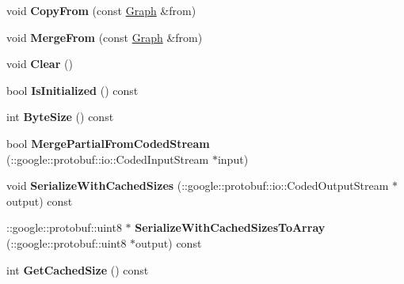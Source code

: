 \begin{DoxyCompactItemize}
\item 
\hypertarget{classgraph_1_1Graph_adea321f8fe4c18ea4d2364c8b8dd54df}{
void {\bfseries CopyFrom} (const \hyperlink{classgraph_1_1Graph}{Graph} \&from)}
\label{classgraph_1_1Graph_adea321f8fe4c18ea4d2364c8b8dd54df}

\item 
\hypertarget{classgraph_1_1Graph_a918dc2343415dd9b7d0deb2c307bfb9d}{
void {\bfseries MergeFrom} (const \hyperlink{classgraph_1_1Graph}{Graph} \&from)}
\label{classgraph_1_1Graph_a918dc2343415dd9b7d0deb2c307bfb9d}

\item 
\hypertarget{classgraph_1_1Graph_a13680e6719e42aa3ebedfeb61ff06014}{
void {\bfseries Clear} ()}
\label{classgraph_1_1Graph_a13680e6719e42aa3ebedfeb61ff06014}

\item 
\hypertarget{classgraph_1_1Graph_ac91ebe6fc014af3707afd28a01bf30cc}{
bool {\bfseries IsInitialized} () const }
\label{classgraph_1_1Graph_ac91ebe6fc014af3707afd28a01bf30cc}

\item 
\hypertarget{classgraph_1_1Graph_ada721f70b6221bd45c0619de513bc138}{
int {\bfseries ByteSize} () const }
\label{classgraph_1_1Graph_ada721f70b6221bd45c0619de513bc138}

\item 
\hypertarget{classgraph_1_1Graph_a3a08a0c8418c6317a890296c25f71b9e}{
bool {\bfseries MergePartialFromCodedStream} (::google::protobuf::io::CodedInputStream $\ast$input)}
\label{classgraph_1_1Graph_a3a08a0c8418c6317a890296c25f71b9e}

\item 
\hypertarget{classgraph_1_1Graph_a69559b8d11a32f5ebe89a0c86b936ed6}{
void {\bfseries SerializeWithCachedSizes} (::google::protobuf::io::CodedOutputStream $\ast$output) const }
\label{classgraph_1_1Graph_a69559b8d11a32f5ebe89a0c86b936ed6}

\item 
\hypertarget{classgraph_1_1Graph_a10d32c2e5773f690ac98879300e5a9fa}{
::google::protobuf::uint8 $\ast$ {\bfseries SerializeWithCachedSizesToArray} (::google::protobuf::uint8 $\ast$output) const }
\label{classgraph_1_1Graph_a10d32c2e5773f690ac98879300e5a9fa}

\item 
\hypertarget{classgraph_1_1Graph_a2a609292df58baec63cb473317334301}{
int {\bfseries GetCachedSize} () const }
\label{classgraph_1_1Graph_a2a609292df58baec63cb473317334301}


\end{DoxyCompactItemize}
